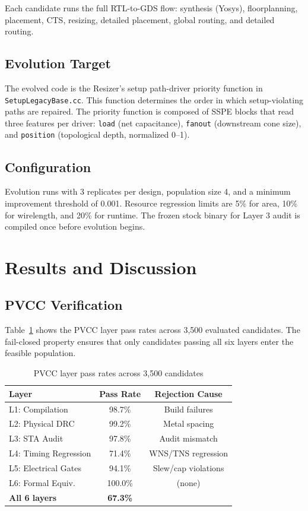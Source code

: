 \documentclass[conference]{IEEEtran}
\begin{document}
Each candidate runs the full RTL-to-GDS flow: synthesis (Yosys), floorplanning, placement, CTS, resizing, detailed placement, global routing, and detailed routing.

\subsection{Evolution Target}
The evolved code is the Resizer's setup path-driver priority function in \texttt{SetupLegacyBase.cc}. This function determines the order in which setup-violating paths are repaired. The priority function is composed of SSPE blocks that read three features per driver: \texttt{load} (net capacitance), \texttt{fanout} (downstream cone size), and \texttt{position} (topological depth, normalized 0--1).

\subsection{Configuration}
Evolution runs with 3 replicates per design, population size 4, and a minimum improvement threshold of 0.001. Resource regression limits are 5\% for area, 10\% for wirelength, and 20\% for runtime. The frozen stock binary for Layer 3 audit is compiled once before evolution begins.

\section{Results and Discussion}

\subsection{PVCC Verification}

Table~\ref{tab:pvcc-results} shows the PVCC layer pass rates across 3,500 evaluated candidates. The fail-closed property ensures that only candidates passing all six layers enter the feasible population.

\begin{table}[t]
\centering
\caption{PVCC layer pass rates across 3,500 candidates}
\label{tab:pvcc-results}
\begin{tabular}{lcc}
\toprule
\textbf{Layer} & \textbf{Pass Rate} & \textbf{Rejection Cause} \\
\midrule
L1: Compilation & 98.7\% & Build failures \\
L2: Physical DRC & 99.2\% & Metal spacing \\
L3: STA Audit & 97.8\% & Audit mismatch \\
L4: Timing Regression & 71.4\% & WNS/TNS regression \\
L5: Electrical Gates & 94.1\% & Slew/cap violations \\
L6: Formal Equiv. & 100.0\% & (none) \\
\midrule
\textbf{All 6 layers} & \textbf{67.3\%} & \\
\bottomrule
\end{tabular}
\end{table}
\end{document}
